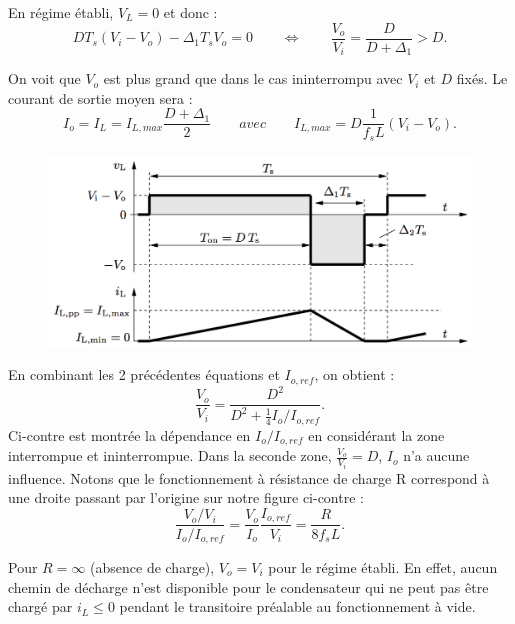 			En régime établi, $V_L = 0$ et donc :
			\begin{equation}
				DT_s (V_i - V_o) - \Delta _1 T_s V_o = 0 \qquad \Leftrightarrow \qquad \frac{V_o}{V_i} = \frac{D}{D+\Delta _1} > D. 
			\end{equation}
			
			On voit que $V_o$ est plus grand que dans le cas ininterrompu avec $V_i$ et $D$ fixés. Le courant de sortie moyen sera :
			\begin{equation}
				I_o = I_L = I_{L,max}\frac{D+\Delta _1}{2}\qquad avec \qquad I_{L,max} = D\frac{1}{f_sL}(V_i-V_o).
			\end{equation}
			
			\begin{figure}
			\vspace{-5mm}
			\includegraphics[scale=0.3]{ch5/7}
			\end{figure}	
			En combinant les 2 précédentes équations et $I_{o,ref}$, on obtient :
			\begin{equation}
				\frac{V_o}{V_i} = \frac{D^2}{D^2+\frac{1}{4}I_o/I_{o,ref}}.
			\end{equation}
			Ci-contre est montrée la dépendance en $I_o/I_{o,ref}$ en considérant la zone interrompue et ininterrompue. Dans la seconde zone, $\frac{V_o}{V_i} = D$, $I_o$ n'a aucune influence. Notons que le fonctionnement à résistance de charge R  correspond à une droite passant par l'origine sur notre figure ci-contre :
			\begin{equation}
				\frac{V_o/V_i}{I_o/I_{o,ref}} = \frac{V_o}{I_o}\frac{I_{o,ref}}{V_i} = \frac{R}{8 f_s L}.
			\end{equation}
			
			Pour $R=\infty$ (absence de charge), $V_o = V_i$ pour le régime établi. En effet, aucun chemin de décharge n'est disponible pour le condensateur qui ne peut pas être chargé par $i_L\leq  0$ pendant le transitoire préalable au fonctionnement à vide. 
			
